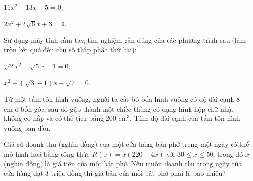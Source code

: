 \begin{exercises}
\begin{questions}[resume=SGK]
\begin{questions}
            \item $11x^2-13x+5=0$;

            \answerline
            \answerline

            \item $2x^2+2\sqrt{6}x+3=0$.

            \answerline
            \answerline
        \end{questions}

        \item Sử dụng máy tính cầm tay, tìm nghiệm gần đúng của các phương trình sau (làm tròn kết quả đến chữ số thập phân thứ hai):
        \begin{questions}
            \item $\sqrt{2}x^2-\sqrt{5}x-1=0$;

            \answerline
            \answerline

            \item $x^2-(\sqrt{3}-1)x-\sqrt{7}=0$.

            \answerline
            \answerline
        \end{questions}

        \item Từ một tấm tôn hình vuông, người ta cắt bỏ bốn hình vuông có độ dài cạnh 8 cm ở bốn góc, sau đó gập thành một chiếc thùng có dạng hình hộp chữ nhật không có nắp và có thể tích bằng 200 cm$^3$. Tính độ dài cạnh của tấm tôn hình vuông ban đầu.

        \answerline
        \answerline
        \answerline

        \item Giả sử doanh thu (nghìn đồng) của một cửa hàng bán phở trong một ngày có thể mô hình hoá bằng công thức $R(x)=x(220-4x)$ với $30\le x\le 50$, trong đó $x$ (nghìn đồng) là giá tiền của một bát phở. Nếu muốn doanh thu trong ngày của cửa hàng đạt 3 triệu đồng thì giá bán của mỗi bát phở phải là bao nhiêu?

        \answerline
        \answerline
        \answerline
    \end{questions}
\end{exercises}
